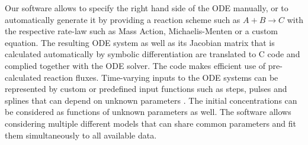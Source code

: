 \documentclass{bioinfo}
\begin{document}
Our software allows to specify the right hand side of the ODE manually, or to 
automatically generate it by  providing a reaction scheme such as $A + B \rightarrow C$ 
with the respective rate-law such as Mass Action, Michaelis-Menten or a custom 
equation. The resulting ODE system as well as its Jacobian matrix that is calculated 
automatically by symbolic differentiation are translated to C code and complied together 
with the ODE solver. The code makes efficient use of pre-calculated reaction fluxes. 
Time-varying inputs to the ODE systems can be represented by custom or predefined input 
functions such as steps, pulses and splines that can depend on unknown parameters 
\citep{Schelker:2012uq}. The initial concentrations can be considered as functions of 
unknown parameters as well. The software allows considering multiple different models 
that can share common parameters and fit them simultaneously to all available data. 
\end{document}
